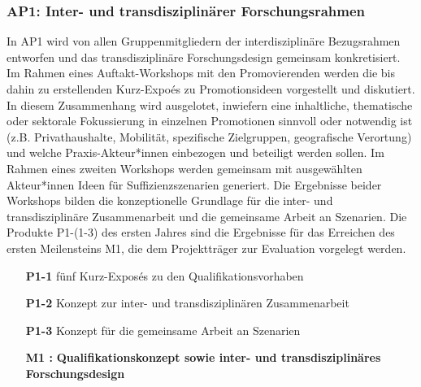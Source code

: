 \documentclass[a4paper,11pt,twoside]{scrartcl}
\begin{document}
\subsubsection*{AP1: Inter- und transdisziplinärer Forschungsrahmen}
In AP1 wird von allen Gruppenmitgliedern der interdisziplinäre Bezugsrahmen entworfen und das transdisziplinäre Forschungsdesign gemeinsam konkretisiert. Im Rahmen eines Auftakt-Workshops mit den Promovierenden werden die bis dahin zu erstellenden Kurz-Expoés zu Promotionsideen vorgestellt und diskutiert.
In diesem Zusammenhang wird ausgelotet, inwiefern eine inhaltliche, thematische oder sektorale Fokussierung in einzelnen Promotionen sinnvoll oder notwendig ist (z.B. Privathaushalte, Mobilität, spezifische Zielgruppen, geografische Verortung) und welche Praxis-Akteur*innen einbezogen und beteiligt werden sollen. Im Rahmen eines zweiten Workshops werden gemeinsam mit ausgewählten Akteur*innen Ideen für Suffizienzszenarien generiert.
Die Ergebnisse beider Workshops bilden die konzeptionelle Grundlage für die inter- und transdisziplinäre Zusammenarbeit und die gemeinsame Arbeit an Szenarien. Die Produkte P1-(1-3) des ersten Jahres sind die Ergebnisse für das Erreichen des ersten Meilensteins M1, die dem Projektträger zur Evaluation vorgelegt werden.
\begin{itemize}
    \item[\textbf{P1-1}] fünf Kurz-Exposés zu den Qualifikationsvorhaben 
    \item[\textbf{P1-2}] Konzept zur inter- und transdisziplinären Zusammenarbeit
    \item[\textbf{P1-3}] Konzept für die gemeinsame Arbeit an Szenarien 
    \item[\textbf{M1 :}] \textbf{Qualifikationskonzept sowie inter- und transdisziplinäres Forschungsdesign}
\end{itemize}
\end{document}
